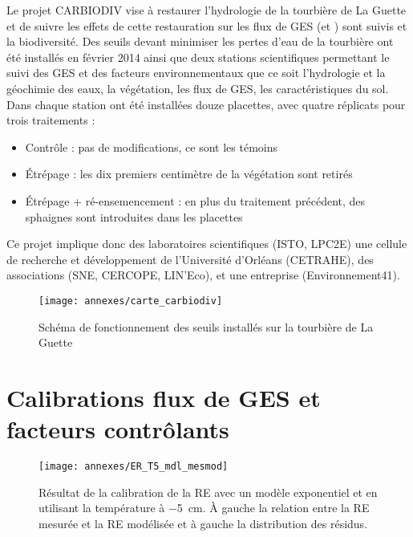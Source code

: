 Le projet CARBIODIV vise à restaurer l'hydrologie de la tourbière de La Guette et de suivre les effets de cette restauration sur les flux de GES (\coo et \chh) sont suivis et la biodiversité.
Des seuils devant minimiser les pertes d'eau de la tourbière ont été installés en février 2014 ainsi que deux stations scientifiques permettant le suivi des GES et des facteurs environnementaux que ce soit l'hydrologie et la géochimie des eaux, la végétation, les flux de GES, les caractéristiques du sol.
Dans chaque station ont été installées douze placettes, avec quatre réplicats pour trois traitements :
\begin{itemize}
\item Contrôle : pas de modifications, ce sont les témoins
\item Étrépage : les dix premiers centimètre de la végétation sont retirés
\item Étrépage + ré-ensemencement : en plus du traitement précédent, des sphaignes sont introduites dans les placettes
\end{itemize}
Ce projet implique donc des laboratoires scientifiques (ISTO, LPC2E) une cellule de recherche et développement de l'Université d'Orléans (CETRAHE), des associations (SNE, CERCOPE, LIN'Eco), et une entreprise (Environnement41).


\begin{figure}[!hbt]
\centering
\texttt{[image: annexes/carte\_carbiodiv]}\\
\caption{Schéma de fonctionnement des seuils installés sur la tourbière de La Guette}
\label{fig:carte_carbiodiv}
\end{figure}





\clearpage
\section{Calibrations flux de GES et facteurs contrôlants}
\label{sec:calib_flux}

\begin{figure}[!hbt]
\centering
\texttt{[image: annexes/ER\_T5\_mdl\_mesmod]}\\
\caption{Résultat de la calibration de la RE avec un modèle exponentiel et en utilisant la température à \SI{-5}{\centi\metre}. À gauche la relation entre la RE mesurée et la RE modélisée et à gauche la distribution des résidus.}
\label{fig:RE_T5}
\end{figure}




